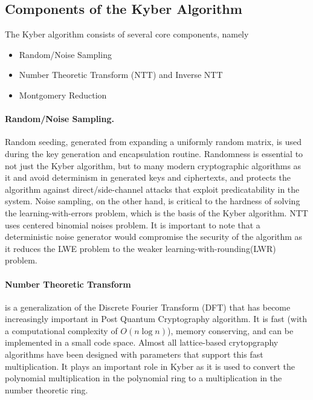 
\subsection*{Components of the Kyber Algorithm}

The Kyber algorithm consists of several core components, namely
\begin{itemize}
    \item Random/Noise Sampling
    \item Number Theoretic Transform (NTT) and Inverse NTT
    \item Montgomery Reduction
\end{itemize}

\paragraph{Random/Noise Sampling.}
Random seeding, generated from expanding a uniformly random matrix, is used during the key generation and encapsulation 
routine. Randomness is essential to not just the Kyber algorithm, but to many modern cryptographic algorithms as it
and avoid determinism in generated keys and ciphertexts, and protects the algorithm against direct/side-channel attacks 
that exploit predicatability in the system. Noise sampling, on the other hand, is critical to the hardness of solving 
the learning-with-errors problem, which is the basis of the Kyber algorithm. NTT uses centered binomial noises problem.
It is important to note that a deterministic noise generator would compromise the security of the algorithm as it reduces
the LWE problem to the weaker learning-with-rounding(LWR) problem.

\paragraph{Number Theoretic Transform} is a generalization of the Discrete Fourier Transform (DFT) that has become 
increasingly important in Post Quantum Cryptography algorithm. It is fast (with a computational complexity of 
$O(n\log n)$), memory conserving, and can be implemented in a small code space. 
Almost all lattice-based crytopgraphy algorithms have been designed with parameters that support this 
fast multiplication. 
It plays an important role in Kyber as it is used to convert the polynomial multiplication in the polynomial ring to 
a multiplication in the number theoretic ring. 


